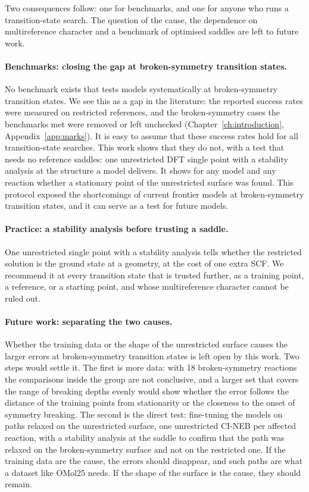 Two consequences follow: one for benchmarks, and one for anyone who runs
a transition-state search. The question of the cause, the dependence on
multireference character and a benchmark of optimised saddles are left
to future work.

\paragraph{Benchmarks: closing the gap at broken-symmetry transition states.}
No benchmark exists that tests models systematically at
broken-symmetry transition states. We see this as a gap in the
literature: the reported success rates were measured on restricted
references, and the broken-symmetry cases the benchmarks met were
removed or left unchecked (Chapter~\ref{ch:introduction},
Appendix~\ref{app:marks}). It is easy to assume that these success rates
hold for all transition-state searches. This work shows that they do
not, with a test that needs no reference saddles: one unrestricted DFT
single point with a stability analysis at the structure a model
delivers. It shows for any model and any reaction whether a stationary
point of the unrestricted surface was found. This protocol exposed the
shortcomings of current frontier models at broken-symmetry transition
states, and it can serve as a test for future models.

\paragraph{Practice: a stability analysis before trusting a saddle.} One unrestricted single point with a
stability analysis tells whether the restricted solution is the ground
state at a geometry, at the cost of one extra SCF. We recommend it at
every transition state that is trusted further, as a training point,
a reference, or a starting point, and whose multireference character
cannot be ruled out.

\paragraph{Future work: separating the two causes.} Whether the
training data or the shape of the unrestricted surface causes the
larger errors at broken-symmetry transition states is left open by this
work. Two steps would settle it. The first is more data: with 18
broken-symmetry reactions the comparisons inside the group are not
conclusive, and a larger set that covers the range of breaking depths
evenly would show whether the error follows the distance of the
training points from stationarity or the closeness to the onset of
symmetry breaking. The second is the direct test: fine-tuning the
models on paths relaxed on the unrestricted surface, one unrestricted
CI-NEB per affected reaction, with a stability analysis at the saddle
to confirm that the path was relaxed on the broken-symmetry surface and
not on the restricted one. If the training data are the cause, the
errors should disappear, and such paths are what a dataset like OMol25
needs. If the shape of the surface is the cause, they should remain.


